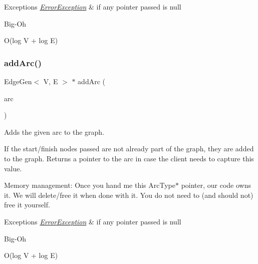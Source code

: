 \begin{DoxyExceptions}{Exceptions}
{\em \mbox{\hyperlink{classErrorException}{Error\+Exception}}} & if any pointer passed is null \\
\hline
\end{DoxyExceptions}
\begin{DoxyRefDesc}{Big-\/\+Oh}
\item[\mbox{\hyperlink{BigOh__BigOh000043}{Big-\/\+Oh}}]O(log V + log E) \end{DoxyRefDesc}
\mbox{\label{classGraph_aa1b6553e579c03260253a2d731668dfa}} 
\subsubsection{\texorpdfstring{add\+Arc()}{addArc()}\hspace{0.1cm}{\footnotesize\ttfamily [3/3]}}
{\footnotesize\ttfamily Edge\+Gen$<$ V, E $>$  $\ast$ add\+Arc (\begin{DoxyParamCaption}\item[{Edge\+Gen$<$ V, E $>$  $\ast$}]{arc }\end{DoxyParamCaption})\hspace{0.3cm}{\ttfamily [inherited]}}



Adds the given arc to the graph. 

If the start/finish nodes passed are not already part of the graph, they are added to the graph. Returns a pointer to the arc in case the client needs to capture this value.

Memory management\+: Once you hand me this Arc\+Type$\ast$ pointer, our code owns it. We will delete/free it when done with it. You do not need to (and should not) free it yourself.


\begin{DoxyExceptions}{Exceptions}
{\em \mbox{\hyperlink{classErrorException}{Error\+Exception}}} & if any pointer passed is null \\
\hline
\end{DoxyExceptions}
\begin{DoxyRefDesc}{Big-\/\+Oh}
\item[\mbox{\hyperlink{BigOh__BigOh000044}{Big-\/\+Oh}}]O(log V + log E) \end{DoxyRefDesc}
\mbox{\label{classBasicGraphGen_a624c45bedf3986073b0f8a40ab4d85c2}} 
